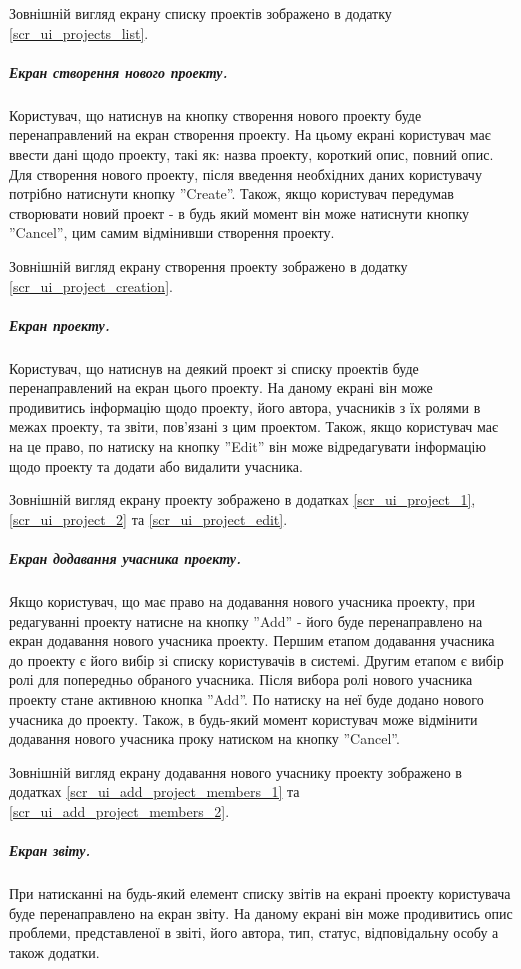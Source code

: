 \documentclass[../main.tex]{subfiles}
\begin{document}
Зовнішній вигляд екрану списку проектів зображено в додатку \ref{scr_ui_projects_list}.

\subparagraph{Екран створення нового проекту.}

Користувач, що натиснув на кнопку створення нового проекту буде перенаправлений на екран створення проекту. На цьому екрані користувач має ввести дані щодо проекту, такі як: назва проекту, короткий опис, повний опис. Для створення нового проекту, після введення необхідних даних користувачу потрібно натиснути кнопку ''Create''. Також, якщо користувач передумав створювати новий проект - в будь який момент він може натиснути кнопку ''Cancel'', цим самим відмінивши створення проекту.

Зовнішній вигляд екрану створення проекту зображено в додатку \ref{scr_ui_project_creation}.

\subparagraph{Екран проекту.}

Користувач, що натиснув на деякий проект зі списку проектів буде перенаправлений на екран цього проекту. На даному екрані він може продивитись інформацію щодо проекту, його автора, учасників з їх ролями в межах проекту, та звіти, пов'язані з цим проектом. Також, якщо користувач має на це право, по натиску на кнопку ''Edit'' він може відредагувати інформацію щодо проекту та додати або видалити учасника.

Зовнішній вигляд екрану проекту зображено в додатках \ref{scr_ui_project_1}, \ref{scr_ui_project_2} та \ref{scr_ui_project_edit}.

\subparagraph{Екран додавання учасника проекту.}

Якщо користувач, що має право на додавання нового учасника проекту, при редагуванні проекту натисне на кнопку ''Add'' - його буде перенаправлено на екран додавання нового учасника проекту. Першим етапом додавання учасника до проекту є його вибір зі списку користувачів в системі. Другим етапом є вибір ролі для попередньо обраного учасника. Після вибора ролі нового учасника проекту стане активною кнопка ''Add''. По натиску на неї буде додано нового учасника до проекту. Також, в будь-який момент користувач може відмінити додавання нового учасника проку натиском на кнопку ''Cancel''.

Зовнішній вигляд екрану додавання нового учаснику проекту зображено в додатках \ref{scr_ui_add_project_members_1} та \ref{scr_ui_add_project_members_2}.

\subparagraph{Екран звіту.}

При натисканні на будь-який елемент списку звітів на екрані проекту користувача буде перенаправлено на екран звіту. На даному екрані він може продивитись опис проблеми, представленої в звіті, його автора, тип, статус, відповідальну особу а також додатки.
\end{document}
